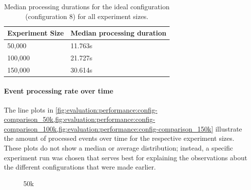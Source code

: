 \begin{table}
\centering
\caption{Median processing durations for the ideal configuration (configuration 8) for all experiment sizes.}
\begin{tabular}{l|l}
\textbf{Experiment Size} & \textbf{Median processing duration} \\ \hline
50,000 & 11.763s \\
100,000 & 21.727s \\
150,000 & 30.614s
\end{tabular}
\label{table:median-durations-config-8}
\end{table}

\paragraph{Event processing rate over time}

The line plots in \cref{fig:evaluation:performance:config-comparison_50k,fig:evaluation:performance:config-comparison_100k,fig:evaluation:performance:config-comparison_150k} illustrate the amount of processed events over time for the respective experiment sizes.
These plots do not show a median or average distribution; instead, a specific experiment run was chosen that serves best for explaining the observations about the different configurations that were made earlier.

\begin{figure}[h]
        \caption{50k}
        \label{fig:evaluation:performance:config-comparison_50k}
\end{figure}

